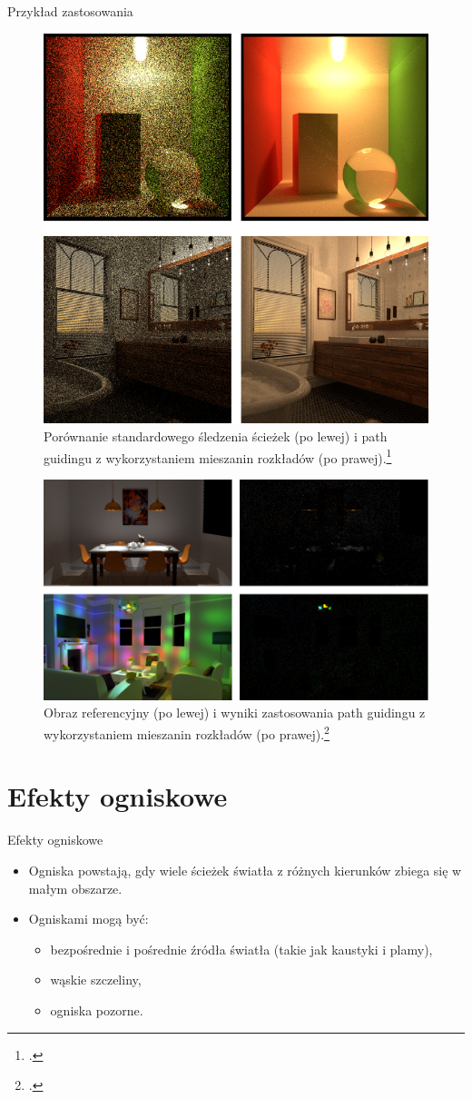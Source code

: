 \documentclass{beamer}
\begin{document}
\begin{frame}{Przykład zastosowania}
\begin{figure}
    \centering
    \includegraphics[width=0.42\linewidth]{img/ruppert_comparison.png}
    \caption{Porównanie standardowego śledzenia ścieżek (po lewej) i path guidingu z wykorzystaniem mieszanin rozkładów (po prawej).\footcite{PMM}}
    \label{fig:enter-label}
\end{figure}

\end{frame}

\begin{frame}{}
    \begin{figure}
        \centering
        \includegraphics[width=0.8\linewidth]{img/ruppert_focal_bad.png}
        \caption{Obraz referencyjny (po lewej) i wyniki zastosowania path guidingu z wykorzystaniem mieszanin rozkładów (po prawej).\footcite{Focal_Guiding}}
        \label{fig:enter-label}
    \end{figure}
\end{frame}

\section{Efekty ogniskowe}
\begin{frame}{Efekty ogniskowe}
    \begin{itemize}
        \item Ogniska powstają, gdy wiele ścieżek światła z różnych kierunków zbiega się w małym obszarze.
        \item Ogniskami mogą być:
        \begin{itemize}
            \item bezpośrednie i pośrednie źródła światła (takie jak kaustyki i plamy),
            \item wąskie szczeliny,
            \item ogniska pozorne.
        \end{itemize}
    \end{itemize}
\end{frame}
\end{document}
